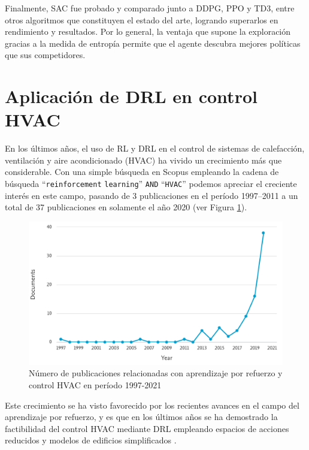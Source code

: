 Finalmente, SAC fue probado y comparado junto a DDPG, PPO y TD3, entre otros algoritmos que constituyen el estado del arte, logrando superarlos en rendimiento y resultados. Por lo general, la ventaja que supone la exploración gracias a la medida de entropía permite que el agente descubra mejores políticas que sus competidores.

\section{Aplicación de DRL en control HVAC}

En los últimos años, el uso de RL y DRL en el control de sistemas de calefacción, ventilación y aire acondicionado (HVAC) ha vivido un crecimiento más que considerable. Con una simple búsqueda en Scopus empleando la cadena de búsqueda ``\texttt{reinforcement} \texttt{learning}'' \texttt{AND} ``\texttt{HVAC}'' podemos apreciar el creciente interés en este campo, pasando de 3 publicaciones en el período 1997--2011 a un total de 37 publicaciones en solamente el año 2020 (ver Figura \ref{fig:scopus}).

\begin{figure}
    \centering
    \includegraphics[width=\textwidth]{imagenes/scopus.png}
    \caption{Número de publicaciones relacionadas con aprendizaje por refuerzo y control HVAC en período 1997-2021}
    \label{fig:scopus}
\end{figure}

Este crecimiento se ha visto favorecido por los recientes avances en el campo del aprendizaje por refuerzo, y es que en los últimos años se ha demostrado la factibilidad del control HVAC mediante DRL empleando espacios de acciones reducidos y modelos de edificios simplificados \cite{zhang2019whole, vazquez2019fusing, moriyama2018reinforcement}.

